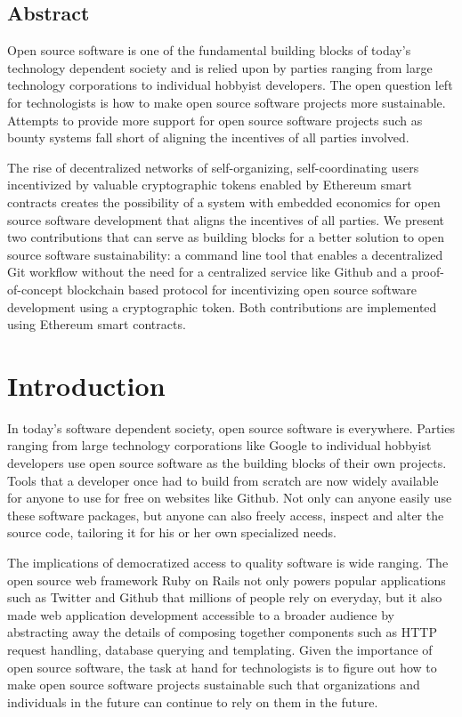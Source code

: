 \subsection*{Abstract}

Open source software is one of the fundamental building blocks of today's
technology dependent society and is relied upon by parties ranging from large technology corporations
to individual hobbyist developers. The open question left for technologists is
how to make open source software projects more sustainable. Attempts to provide more support for open
source software projects such as bounty systems fall short of aligning the
incentives of all parties involved.

The rise of decentralized networks of self-organizing, self-coordinating users
incentivized by valuable cryptographic tokens enabled by Ethereum smart
contracts creates the possibility of a system with embedded economics for open
source software development that aligns the incentives of all parties. We
present two contributions that can serve as building blocks for a better
solution to open source software sustainability: a command line tool that
enables a decentralized Git workflow without the need for a centralized service
like Github and a proof-of-concept blockchain based protocol for incentivizing
open source software development using a cryptographic token. Both contributions
are implemented using Ethereum smart contracts.

\section{Introduction}

In today's software dependent society, open source software is everywhere.
Parties ranging from large technology corporations like Google to individual
hobbyist developers use open source software as the building blocks of their own
projects. Tools that a developer once had to build from scratch are now widely
available for anyone to use for free on websites like Github. Not only can
anyone easily use these software packages, but anyone can also freely access,
inspect and alter the source code, tailoring it for his or her own specialized needs.

The implications of democratized access to quality software is wide ranging. The
open source web framework Ruby on Rails not only powers popular applications
such as Twitter and Github that millions of people rely on everyday, but it also
made web application development accessible to a broader audience by abstracting
away the details of composing together components such as HTTP request handling,
database querying and templating. Given the importance of open source software,
the task at hand for technologists is to figure out how to make open source
software projects sustainable such that organizations and individuals in the
future can continue to rely on them in the future.

